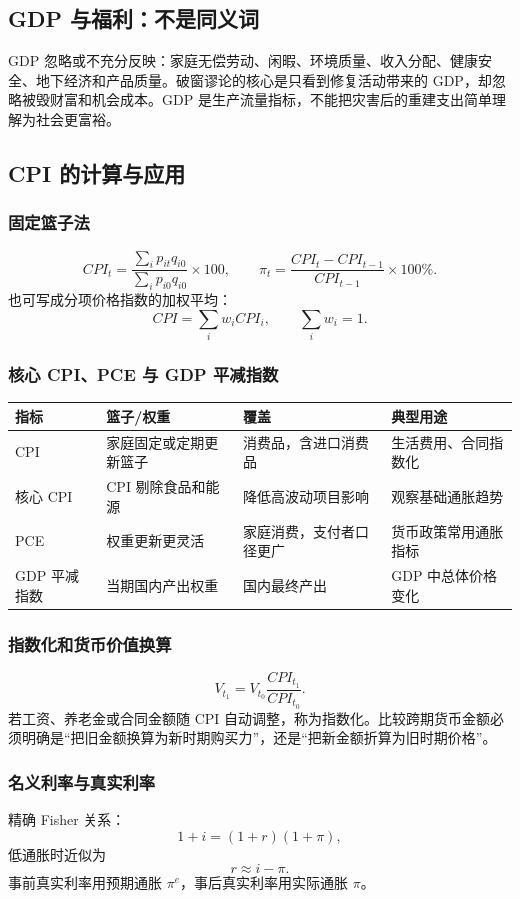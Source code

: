 \documentclass[UTF8,11pt,a4paper]{ctexart}
\begin{document}
\subsection{GDP 与福利：不是同义词}
GDP 忽略或不充分反映：家庭无偿劳动、闲暇、环境质量、收入分配、健康安全、地下经济和产品质量。破窗谬论的核心是只看到修复活动带来的 GDP，却忽略被毁财富和机会成本。GDP 是生产流量指标，不能把灾害后的重建支出简单理解为社会更富裕。

\subsection{CPI 的计算与应用}
\subsubsection{固定篮子法}
\[
CPI_t=\frac{\sum_i p_{it}q_{i0}}{\sum_i p_{i0}q_{i0}}\times100,
\qquad
\pi_t=\frac{CPI_t-CPI_{t-1}}{CPI_{t-1}}\times100\%.
\]
也可写成分项价格指数的加权平均：
\[
CPI=\sum_i w_i CPI_i,
\qquad \sum_i w_i=1.
\]

\subsubsection{核心 CPI、PCE 与 GDP 平减指数}
\begin{longtable}{p{}p{}p{}p{}}
\toprule
指标 & 篮子/权重 & 覆盖 & 典型用途\\
\midrule
CPI & 家庭固定或定期更新篮子 & 消费品，含进口消费品 & 生活费用、合同指数化\\
核心 CPI & CPI 剔除食品和能源 & 降低高波动项目影响 & 观察基础通胀趋势\\
PCE & 权重更新更灵活 & 家庭消费，支付者口径更广 & 货币政策常用通胀指标\\
GDP 平减指数 & 当期国内产出权重 & 国内最终产出 & GDP 中总体价格变化\\
\bottomrule
\end{longtable}

\subsubsection{指数化和货币价值换算}
\[
V_{t_1}=V_{t_0}\frac{CPI_{t_1}}{CPI_{t_0}}.
\]
若工资、养老金或合同金额随 CPI 自动调整，称为指数化。比较跨期货币金额必须明确是“把旧金额换算为新时期购买力”，还是“把新金额折算为旧时期价格”。

\subsubsection{名义利率与真实利率}
精确 Fisher 关系：
\[
1+i=(1+r)(1+\pi),
\]
低通胀时近似为
\[
r\approx i-\pi.
\]
事前真实利率用预期通胀 $\pi^e$，事后真实利率用实际通胀 $\pi$。
\end{document}
